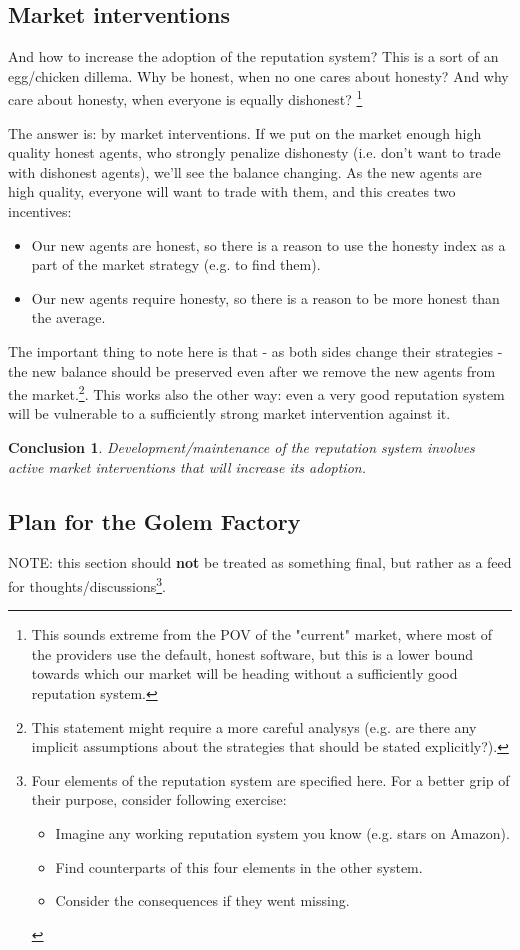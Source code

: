 \documentclass{article}
\newtheorem{conclusion}{Conclusion}[section]
\begin{document}
\subsection{Market interventions}

And how to increase the adoption of the reputation system?
This is a sort of an egg/chicken dillema. Why be honest, when no one cares about honesty? And why care about honesty, when everyone is equally dishonest? \footnote{
    This sounds extreme from the POV of the "current" market, where most of the providers use the default, honest software, but this is a lower bound
    towards which our market will be heading without a sufficiently good reputation system.}

The answer is: by market interventions. If we put on the market enough high quality honest agents, who strongly penalize dishonesty 
(i.e. don't want to trade with dishonest agents), we'll see the balance changing. 
As the new agents are high quality, everyone will want to trade with them, and this creates two incentives:
\begin{itemize}
    \item Our new agents are honest, so there is a reason to use the honesty index as a part of the market strategy (e.g. to find them).
    \item Our new agents require honesty, so there is a reason to be more honest than the average.
\end{itemize}

The important thing to note here is that - as both sides change their strategies - the new balance should be preserved even after we remove the new agents from the market.\footnote{
    This statement might require a more careful analysys (e.g. are there any implicit assumptions about the strategies that should be stated explicitly?).
}. This works also the other way: even a very good reputation system will be vulnerable to a sufficiently strong market intervention against it.

\begin{conclusion}
Development/maintenance of the reputation system involves active market interventions that will increase its adoption.
\end{conclusion}

\subsection{Plan for the Golem Factory}

NOTE: this section should \textbf{not} be treated as something final, but rather as a feed for thoughts/discussions\footnote{
    Four elements of the reputation system are specified here. For a better grip of their purpose, consider following exercise:
    \begin{itemize}
        \item Imagine any working reputation system you know (e.g. stars on Amazon).
        \item Find counterparts of this four elements in the other system.
        \item Consider the consequences if they went missing.
    \end{itemize}
}.
\end{document}
